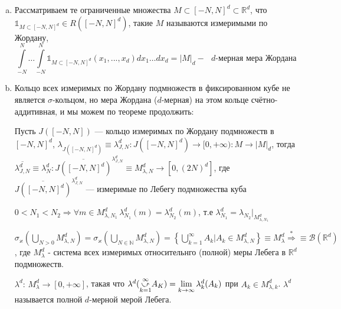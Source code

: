 \documentclass[a4paper, 12pt]{article}
\begin{document}
\begin{enumerate}[a)]
    \item  
    \begin{definition}
        Рассматриваем те ограниченные множества $M \subset [-N, N]^d \subset \mathbb{R}^d$, что $\mathds{1}_{M \subset [-N, N]^d} \in R \left([-N, N]^d \right)$, такие $M$ называются измеримыми по Жордану, 
        $$ \int \limits_{-N}^{N} \dots \int \limits_{-N}^{N} \mathds{1}_{M \subset [-N, N]^d} (x_1, ..., x_d) dx_1 \dots dx_d = |M|_d - \text{ $d$-мерная мера Жордана}$$
    \end{definition}
    \item Кольцо всех измеримых по Жордану подмножеств в фиксированном кубе не является $\sigma$-кольцом, но мера Жордана ($d$-мерная) на этом кольце счётно-аддитивная, и мы можем по теореме продолжить:
    
    Пусть $J([-N, N])$ --- кольцо измеримых по Жордану подмножеств в $[-N, N]^d$, $\lambda_{J([-N, N]^d)} \equiv \lambda_{J, N}^d: J([-N, N]^d) \rightarrow [0, +\infty): M \rightarrow |M|_d$, тогда $\overline{\lambda_{J, N}^d} \equiv \lambda^d_N : \overline{J([-N, N]^d)}^{\lambda_{J, N}^{d}} \equiv M_{\lambda, N}^d \rightarrow [0, (2N)^d]$, где $\overline{J([-N, N]^d)}^{\lambda_{J, N}^{d}}$ --- измеримые по Лебегу подмножества куба

    \begin{remark}
        $0 < N_1 < N_2 \Rightarrow \forall m \in M_{\lambda, N_1}^d \, \lambda_{N_1}^d(m) = \lambda_{N_2}^d(m)$, т.е $\lambda_{N_1}^d = \lambda_{N_2} \big|_{M_{\lambda, N_1}^d}$
    \end{remark}

    \begin{problem}
        $\sigma_{\varkappa} \left(\bigcup \limits_{N > 0} M_{\lambda, N}^d \right) = \sigma_{\varkappa} \left(\bigcup \limits_{N \in \mathbb{N}} M_{\lambda, N}^d \right) = \left\{ \bigcup \limits_{k = 1}^{\infty} A_k | A_k \in M_{\lambda, N}^d \right\} \equiv M_{\lambda}^d \overset{*}{\Rightarrow} \equiv \mathscr{B}(\mathbb{R}^d)$, где $M_{\lambda}^d$ - система всех измеримых относительнго (полной) меры Лебега в $\mathbb{R}^d$ подмножеств.
    \end{problem}

    \begin{definition}
        $\lambda^d: \, M_{\lambda}^d \rightarrow [0, +\infty]$, такая что $\lambda^d(\cuparr{k = 1}{\infty} A_K) = \lim \limits_{k \rightarrow \infty} \lambda_{k}^d(A_k)$ при $A_k \in M_{\lambda, k}^d$.
        $\lambda ^ d$ называется полной $d$-мерной мерой Лебега.
    \end{definition}


\end{enumerate}
\end{document}
